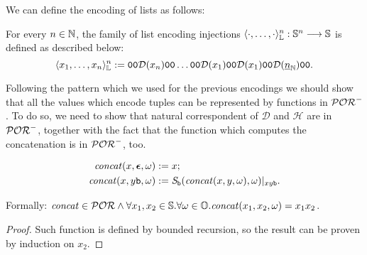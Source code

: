 We can define the encoding
of lists as follows:


\begin{defn}
For every $n \in \mathbb{N}$, the family of list encoding injections
$\langle{\cdot, \ldots, \cdot}\rangle^{n}_{\mathbb{L}}: \mathbb{S}^n \longrightarrow \mathbb{S}$
is defined
as described below:
$$
\langle{x_1, \ldots, x_n}\rangle^{n}_{\mathbb{L}}
:= {\mathtt{0}\mathtt{0} \mathcal{D} (x_n)
\mathtt{0}\mathtt{0}
\dots \mathtt{0} \mathtt{0} \mathcal{D}(x_1) \mathtt{0}\mathtt{0}
\mathcal{D}(x_1)\mathtt{0}\mathtt{0}\mathcal{D}({\underline{n}}_{\mathbb{N}})
\mathtt{0}\mathtt{0}}.
$$
\end{defn}
%
%
Following the pattern which we used for the previous encodings we should show
that all the values which encode tuples can be represented by functions in
$\mathcal{POR}^-$. To do so, we need to show that natural correspondent of $\mathcal{D}$ and $\mathcal{H}$
are in $\mathcal{POR}^-$, together
with the fact that the function which computes the concatenation is in $\mathcal{POR}^-$, too.

\begin{defn}
  \label{def:concat}
  \begin{align*}
    \mathit{concat}(x, \bm{\epsilon}, \omega) &:= x;\\
    \mathit{concat}(x, y\mathtt{b}, \omega) &:= \emph{S}_{\mathtt{b}}(\mathit{concat}(x, y, \omega), \omega)|_{xy\mathtt{b}}.
  \end{align*}
\end{defn}

\begin{lemma}
  Formally: $\mathit{concat} \in \mathcal{POR}\land \forall x_1, x_2 \in \mathbb{S}.\forall \omega \in \mathbb{O}. \mathit{concat}(x_1, x_2, \omega)=x_1x_2$.
\end{lemma}
\begin{proof}
  Such function is defined by bounded recursion, so the result can be proven
  by induction on $x_2$.
\end{proof}

